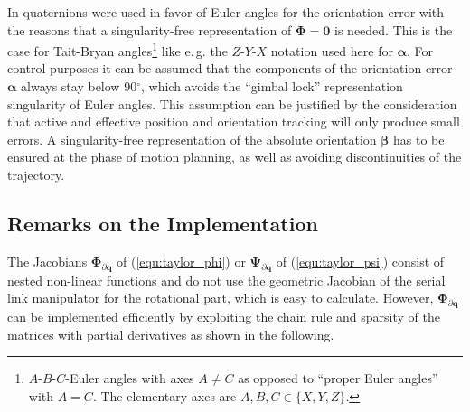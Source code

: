 \documentclass[twocolumn,10pt]{IFTOMM}
\newcommand{\bm}[1]{\boldsymbol{#1}}
\begin{document}
In \cite{Zlajpah2017} quaternions were used in favor of Euler angles for the orientation error with the reasons that a singularity-free representation of $\bm{\Phi}=\bm{0}$ is needed.
This is the case for Tait-Bryan angles\footnote{$A$-$B$-$C$-Euler angles with axes $A \ne C$ as opposed to ``proper Euler angles'' with $A = C$. The elementary axes are $A,B,C \in \{ X,Y,Z\}$.} like e.\,g. the $Z$-$Y$-$X$ notation used here for $\bm{\alpha}$.
For control purposes it can be assumed that the components of the orientation error $\bm{\alpha}$ always stay below 90$^\circ$, which avoids the ``gimbal lock'' representation singularity of Euler angles.
This assumption can be justified by the consideration that active and effective position and orientation tracking will only produce small errors.
A singularity-free representation of the absolute orientation $\bm{\beta}$ has to be ensured at the phase of motion planning, as well as avoiding discontinuities of the trajectory.

\subsection{Remarks on the Implementation}
\label{sec:RecEulAng_implement}

The Jacobians $\bm{\Phi}_{\partial\bm{q}}$ of (\ref{equ:taylor_phi}) or $\bm{\Psi}_{\partial\bm{q}}$ of (\ref{equ:taylor_psi}) consist of nested non-linear functions and do not use the geometric Jacobian of the serial link manipulator for the rotational part, which is easy to calculate. 
%
However, $\bm{\Phi}_{\partial\bm{q}}$ can be implemented efficiently by exploiting the chain rule and sparsity of the matrices with partial derivatives as shown in the following.
\end{document}
